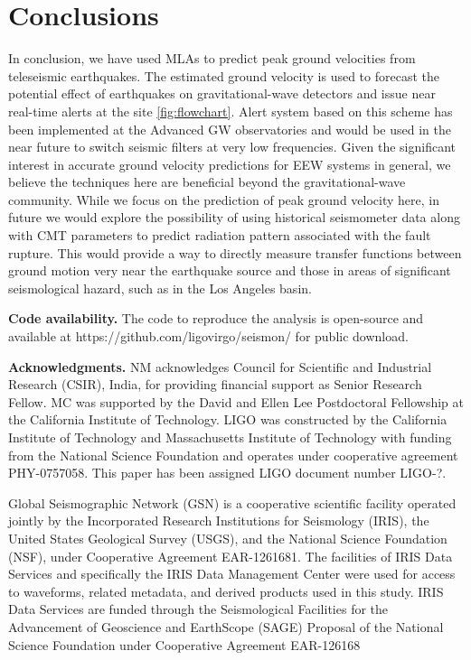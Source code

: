 \documentclass[reprint, prl, aps, showpacs]{revtex4-1}
\begin{document}
\section{Conclusions}
In conclusion, we have used MLAs to predict peak ground velocities from teleseismic earthquakes. The estimated ground velocity is used to forecast the potential effect of earthquakes on gravitational-wave detectors and issue near real-time alerts at the site \ref{fig:flowchart}. Alert system based on this scheme has been implemented at the Advanced GW observatories and would be used in the near future to switch seismic filters at very low frequencies. Given the significant interest in accurate ground velocity predictions for EEW systems in general, we believe the techniques here are beneficial beyond the gravitational-wave community.
While we focus on the prediction of peak ground velocity here, in future we would explore the possibility of using historical seismometer data along with CMT parameters to predict radiation pattern associated with the fault rupture.
This would provide a way to directly measure transfer functions between ground motion very near the earthquake source and those in areas of significant seismological hazard, such as in the Los Angeles basin.


\textbf{Code availability.}
The code to reproduce the analysis is open-source and available at https://github.com/ligovirgo/seismon/ for public download.

\textbf{Acknowledgments.}
NM acknowledges Council for Scientific and Industrial Research (CSIR), India, for providing financial support as Senior Research Fellow.  MC was supported by the David and Ellen Lee Postdoctoral Fellowship at the California Institute of Technology. LIGO was constructed by the California Institute of Technology and Massachusetts Institute of Technology with funding from the National Science Foundation and operates under cooperative agreement PHY-0757058.
This paper has been assigned LIGO document number LIGO-?.

Global Seismographic Network (GSN) is a cooperative scientific facility operated jointly by the Incorporated Research Institutions for Seismology (IRIS), the United States Geological Survey (USGS), and the National Science Foundation (NSF), under Cooperative Agreement EAR-1261681.
The facilities of IRIS Data Services and specifically the IRIS Data Management Center were used for access to waveforms, related metadata, and derived products used in this study. IRIS Data Services are funded through the Seismological Facilities for the Advancement of Geoscience and EarthScope (SAGE) Proposal of the National Science Foundation under Cooperative Agreement EAR-126168



\end{document}
